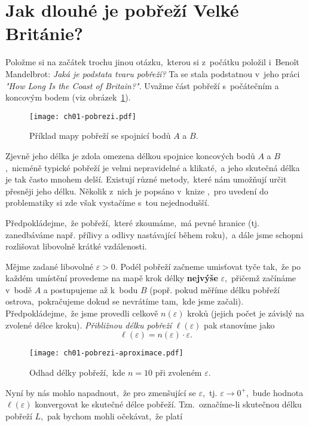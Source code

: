 \section{Jak dlouhé je pobřeží Velké Británie?}\label{sec:pobrezi_velke_britanie}
Položme si na začátek trochu jinou otázku,~kterou si z~počátku položil i~Benoît Mandelbrot: \emph{Jaká je podstata tvaru pobřeží?} Ta se stala podstatnou v~jeho práci \emph{"How Long Is the Coast of Britain?"}. Uvažme část pobřeží s~počátečním a koncovým bodem (viz obrázek~\ref{fig:pobrezi}).
\begin{figure}[h]
    \centering
    \texttt{[image: ch01-pobrezi.pdf]}
    \caption{Příklad mapy pobřeží se spojnicí bodů $A$ a $B$.}
    \label{fig:pobrezi}
\end{figure}
Zjevně jeho délka je zdola omezena délkou spojnice koncových bodů $A$ a $B$,~nicméně typické pobřeží je velmi nepravidelné a klikaté,~a jeho skutečná délka je tak často mnohem delší. Existují různé metody,~které nám umožňují určit přesněji jeho délku. Několik z~nich je popsáno v~knize \citep[str. 79]{Mandelbrot1983},~pro uvedení do problematiky si zde však vystačíme s~tou nejednodušší.\par
Předpokládejme,~že pobřeží,~které zkoumáme,~má pevné hranice (tj. zanedbáváme např. přílivy a odlivy nastávající během roku),~a dále jsme schopni rozlišovat libovolně krátké vzdálenosti.\par
Mějme zadané libovolné $\varepsilon>0$. Podél pobřeží začneme umisťovat tyče tak,~že po každém umístění provedeme na mapě krok délky \textbf{nejvýše} $\varepsilon$,~přičemž začínáme v~bodě $A$ a postupujeme až k~bodu $B$ (popř. pokud měříme délku pobřeží ostrova,~pokračujeme dokud se nevrátíme tam,~kde jsme začali). Předpokládejme,~že jsme provedli celkově $n(\varepsilon)$ kroků (jejich počet je závislý na zvolené délce kroku). \emph{Přibližnou délku pobřeží} $\ell(\varepsilon)$ pak stanovíme jako
\begin{equation*}
    \ell(\varepsilon)=n(\varepsilon)\cdot\varepsilon.
\end{equation*}
\begin{figure}[h]
    \centering
    \texttt{[image: ch01-pobrezi-aproximace.pdf]}
    \caption{Odhad délky pobřeží,~kde $n=10$ při zvoleném $\varepsilon$.}
    \label{fig:pobrezi_aproximace}
\end{figure}
Nyní by nás mohlo napadnout,~že pro zmenšující se $\varepsilon$,~tj. $\varepsilon\to0^+$,~bude hodnota $\ell(\varepsilon)$ konvergovat ke skutečné délce pobřeží. Tzn.~označíme-li skutečnou délku pobřeží $L$,~pak bychom mohli očekávat,~že platí
